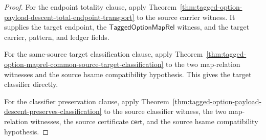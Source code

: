 \begin{proof}
For the endpoint totality clause, apply
Theorem~\ref{thm:tagged-option-payload-descent-total-endpoint-transport} to the
source carrier witness. It supplies the target endpoint, the
$\mathsf{TaggedOptionMapRel}$ witness, and the target carrier, pattern, and
ledger fields.

For the same-source target classification clause, apply
Theorem~\ref{thm:tagged-option-maprel-common-source-target-classification} to
the two map-relation witnesses and the source hsame compatibility hypothesis.
This gives the target classifier directly.

For the classifier preservation clause, apply
Theorem~\ref{thm:tagged-option-payload-descent-preserves-classification} to the
source classifier witness, the two map-relation witnesses, the source
certificate $\mathsf{cert}$, and the source hsame compatibility hypothesis.
\end{proof}
